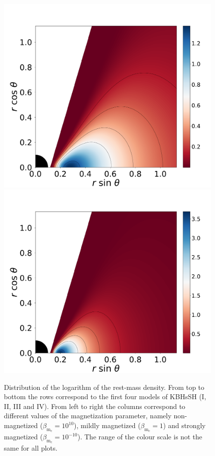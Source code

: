 \documentclass[twocolumn,aps,showpacs,showkeys,prd,superscriptaddress,byrevtex, amsmath]{revtex4-1}
\begin{document}
\begin{figure}
\includegraphics[scale=0.14]{figures/fig1_IV_1.pdf}
\hspace{-0.2cm}
\includegraphics[scale=0.14]{figures/fig1_IV__10.pdf}
\hspace{-0.2cm}
\caption{Distribution of the logarithm of the rest-mass density. From top to bottom the rows correspond to the first four models of KBHsSH (I, II, III and IV). From left to right the columns correspond to different values of the magnetization parameter, namely non-magnetized ($\beta_{\mathrm{m}_{\mathrm{c}}} = 10^{10}$), mildly magnetized ($\beta_{\mathrm{m}_{\mathrm{c}}} = 1$) and strongly magnetized ($\beta_{\mathrm{m}_{\mathrm{c}}} = 10^{-10}$). The range of the colour scale is not the same for all plots.
}
\label{models_I}
\end{figure}
\end{document}
